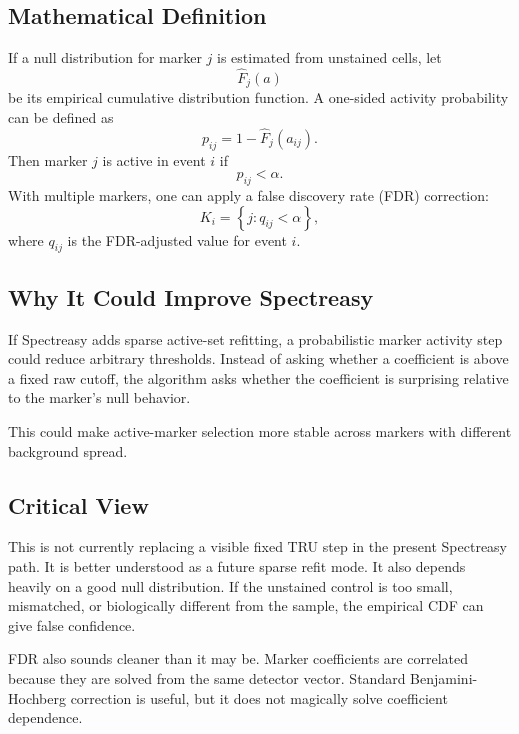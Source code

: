 \documentclass[11pt]{article}
\begin{document}
\subsection*{Mathematical Definition}

If a null distribution for marker \(j\) is estimated from unstained cells, let
\begin{equation}
  \hat{F}_j(a)
\end{equation}
be its empirical cumulative distribution function. A one-sided activity
probability can be defined as
\begin{equation}
  p_{ij}
  =
  1 - \hat{F}_j(a_{ij}).
\end{equation}
Then marker \(j\) is active in event \(i\) if
\begin{equation}
  p_{ij} < \alpha.
\end{equation}
With multiple markers, one can apply a false discovery rate (FDR) correction:
\begin{equation}
  K_i
  =
  \left\{
    j : q_{ij} < \alpha
  \right\},
\end{equation}
where \(q_{ij}\) is the FDR-adjusted value for event \(i\).

\subsection*{Why It Could Improve Spectreasy}

If Spectreasy adds sparse active-set refitting, a probabilistic marker activity
step could reduce arbitrary thresholds. Instead of asking whether a coefficient
is above a fixed raw cutoff, the algorithm asks whether the coefficient is
surprising relative to the marker's null behavior.

This could make active-marker selection more stable across markers with
different background spread.

\subsection*{Critical View}

This is not currently replacing a visible fixed TRU step in the present
Spectreasy path. It is better understood as a future sparse refit mode. It also
depends heavily on a good null distribution. If the unstained control is too
small, mismatched, or biologically different from the sample, the empirical CDF
can give false confidence.

FDR also sounds cleaner than it may be. Marker coefficients are correlated
because they are solved from the same detector vector. Standard Benjamini-Hochberg
correction is useful, but it does not magically solve coefficient dependence.
\end{document}
